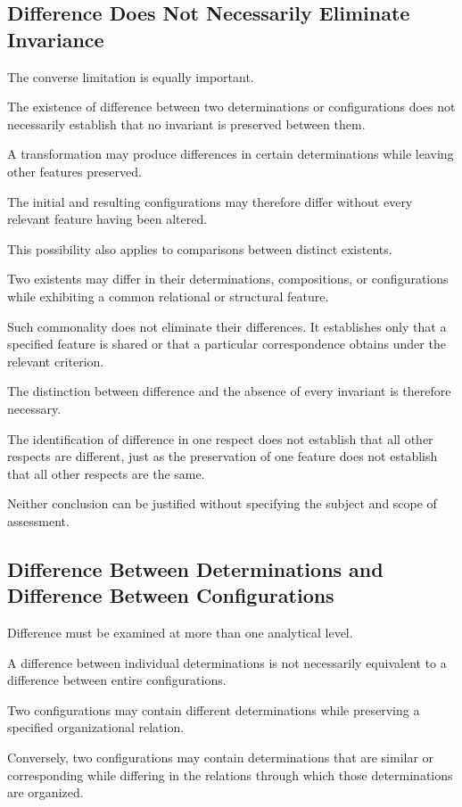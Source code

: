 \subsection{Difference Does Not Necessarily Eliminate Invariance}

The converse limitation is equally important.

The existence of difference between two
determinations or configurations does not
necessarily establish that no invariant is
preserved between them.

A transformation may produce differences in
certain determinations while leaving other
features preserved.

The initial and resulting configurations may
therefore differ without every relevant feature
having been altered.

This possibility also applies to comparisons
between distinct existents.

Two existents may differ in their determinations,
compositions, or configurations while exhibiting
a common relational or structural feature.

Such commonality does not eliminate their
differences. It establishes only that a specified
feature is shared or that a particular correspondence
obtains under the relevant criterion.

The distinction between difference and the absence
of every invariant is therefore necessary.

The identification of difference in one respect
does not establish that all other respects are
different, just as the preservation of one feature
does not establish that all other respects are
the same.

Neither conclusion can be justified without
specifying the subject and scope of assessment.

\subsection{Difference Between Determinations and Difference Between Configurations}

Difference must be examined at more than one
analytical level.

A difference between individual determinations
is not necessarily equivalent to a difference
between entire configurations.

Two configurations may contain different
determinations while preserving a specified
organizational relation.

Conversely, two configurations may contain
determinations that are similar or corresponding
while differing in the relations through which
those determinations are organized.

